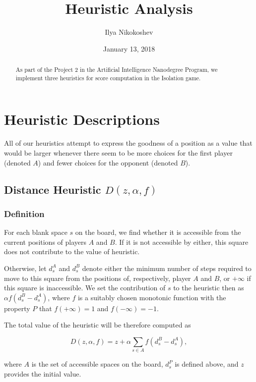 \documentclass[oneside]{article}   	%
\title{Heuristic Analysis}
\author{Ilya Nikokoshev}
\date{January 13, 2018}
\begin{document}
\maketitle

\begin{abstract}
As part of the Project 2 in the Artificial Intelligence Nanodegree Program, we implement three heuristics for score computation in the Isolation game.
\end{abstract}

\tableofcontents

\section{Heuristic Descriptions}

All of our heuristics attempt to express the goodness of a position as a value that would be larger whenever there seem to be more choices for the first player (denoted $A$) and fewer choices for the opponent (denoted $B$).


\subsection{Distance Heuristic $D(z, \alpha, f)$}

\subsubsection{Definition}

For each blank space $s$ on the board, we find whether it is accessible from the current positions of players $A$ and $B$. If it is not accessible by either, this square does not contribute to the value of heuristic. 

Otherwise, let $d^A_s$ and $d^B_s$ denote either the minimum number of steps required to move to this square from the positions of, respectively, player $A$ and $B$, or $+\infty$ if this square is inaccessible. We set the contribution of $s$ to the heuristic then as $\alpha f(d^B_s-d^A_s)$,
where $f$ is a suitably chosen monotonic function with the property $P$ that $f(+\infty) = 1$ and $f(-\infty) = -1$. 

The total value of the heuristic will be therefore computed as 

$$D(z, \alpha, f) = z + \alpha\sum_{s\in A}f(d^B_s-d^A_s), $$

where $A$ is the set of accessible spaces on the board, $d^P_s$ is defined above, and $z$ provides the initial value. 
\end{document}

